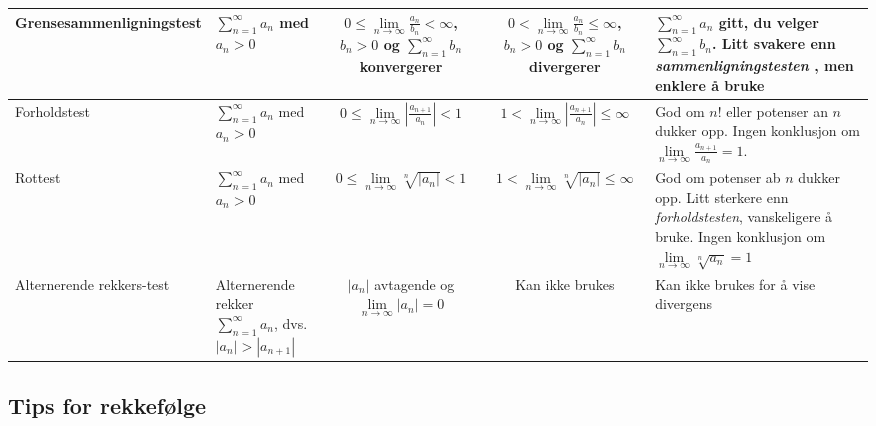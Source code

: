 \documentclass[11pt]{article}
\theoremstyle{definition}
\theoremstyle{definition}
\theoremstyle{definition}
\theoremstyle{definition}
\theoremstyle{definition}
\theoremstyle{definition}
\begin{document}
\begin{table}[!ht]
{\begin{tabular}{|l|p{5cm}|c|c|p{7cm}|}
				Grensesammenligningstest  &  \(\sum_{n=1}^{\infty}a_n  \) med \(a_n >0\)                  &        \(0\leq \lim\limits_{n\rightarrow \infty}\frac{a_n}{b_n} <\infty \), \(b_n>0\)      og \(\sum_{n=1}^{\infty}b_n  \)  konvergerer      &               \(0<\lim\limits_{n\rightarrow \infty}\frac{a_n}{b_n}\leq \infty \), \(b_n>0\) og \(\sum_{n=1}^{\infty}b_n\) divergerer       &  \(\sum_{n=1}^{\infty} a_n\) gitt, du velger \(\sum_{n=1}^{\infty}b_n\). Litt svakere enn \textit{sammenligningstesten }     , men enklere å bruke             \\ \hline
				
				Forholdstest              &   \(\sum_{n=1}^{\infty}a_n  \) med \(a_n >0\)                   &  \(0 \leq \lim\limits_{n\rightarrow \infty}\left| \frac{a_{n+1}}{a_n}\right| <1 \)                      &                \(1 < \lim\limits_{n\rightarrow \infty}\left| \frac{a_{n+1}}{a_n}\right| \leq \infty \)        &  God om \(n!\) eller potenser an \(n\) dukker opp. Ingen konklusjon om \(\lim\limits_{n\rightarrow \infty}\frac{a_{n+1}}{a_n}=1. \)                  \\ \hline
				
				Rottest                   &  \(\sum_{n=1}^{\infty}a_n  \) med \(a_n >0\)                    &                  \(0 \leq  \lim\limits_{n\rightarrow \infty}\sqrt[n]{\left| a_n\right| }<1 \)      &               \(1 <  \lim\limits_{n\rightarrow \infty}\sqrt[n]{\left| a_n\right| }\leq \infty    \)    &            God om potenser ab \(n\) dukker opp. Litt sterkere enn \textit{forholdstesten}, vanskeligere å bruke. Ingen konklusjon om \(\lim\limits_{n\rightarrow \infty}\sqrt[n]{a_n} =1\)       \\ \hline
				
				Alternerende rekkers-test &    Alternerende rekker \(\sum_{n=1}^{\infty}a_n\), dvs. \(|a_n|>|a_{n+1}|\)                &           \({|a_n|}\) avtagende og \(\lim\limits_{n\rightarrow \infty} |a_n|=0\)             &
				Kan ikke brukes                       &     
				Kan ikke brukes for å vise divergens               \\ \hline
			\end{tabular}
		}
		\end{table}
	
	\newpage
		\subsection{Tips for rekkefølge}
		
\end{document}
